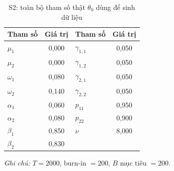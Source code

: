 \documentclass[11pt,a4paper]{article}
\begin{document}
\begin{table}[H]\centering\small
\caption{S2: toàn bộ tham số thật $\theta_0$ dùng để sinh dữ liệu}
\begin{tabularx}{\textwidth}{l C  l C}
\toprule
\textbf{Tham số} & \textbf{Giá trị} & \textbf{Tham số} & \textbf{Giá trị} \\
\midrule
$\mu_1$ & 0{,}000 & $\gamma_{1,1}$ & 0{,}050 \\
$\mu_2$ & 0{,}000 & $\gamma_{1,2}$ & 0{,}050 \\
$\omega_1$ & 0{,}080 & $\gamma_{2,1}$ & 0{,}050 \\
$\omega_2$ & 0{,}140 & $\gamma_{2,2}$ & 0{,}050 \\
$\alpha_1$ & 0{,}060 & $p_{11}$ & 0{,}950 \\
$\alpha_2$ & 0{,}080 & $p_{22}$ & 0{,}900 \\
$\beta_1$ & 0{,}850 & $\nu$ & 8{,}000 \\
$\beta_2$ & 0{,}830 & & \\
\bottomrule
\end{tabularx}
\vspace{0.2em}\raggedright\scriptsize \emph{Ghi chú:} $T=2000$, burn-in $=200$, $B$ mục tiêu $=200$.
\end{table}
\end{document}
